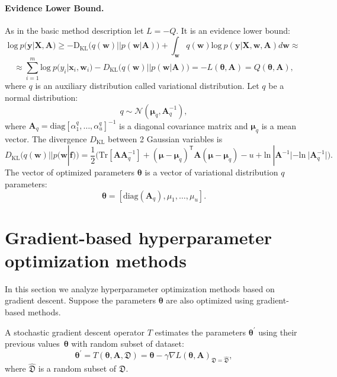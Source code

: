 \documentclass[smallextended]{svjour3}
\begin{document}
\paragraph{Evidence Lower Bound.}
As in the basic method description let $L=-Q$. It is an evidence lower bound:
\begin{equation} 
\label{eq:elbo}
\text{log}~p(\mathbf{y}|\mathbf{X},\mathbf{A})  
\geq 
-\text{D}_\text{KL} \bigl(q(\mathbf{w})||p(\mathbf{w}|\mathbf{A})\bigr) + \int_{\mathbf{w}} q(\mathbf{w})\text{log}~{p(\mathbf{y}|\mathbf{X},\mathbf{w},\mathbf{A})} d \mathbf{w}  \approx
\end{equation}
\[
\approx \sum_{i=1}^m \text{log}~p({y}_i|\mathbf{x}_i, \mathbf{w}_i) - D_\text{KL}\bigl(q (\mathbf{w}) || p (\mathbf{w}|\mathbf{A})\bigr) = -L(\boldsymbol{\theta}, \mathbf{A}) = Q(\boldsymbol{\theta}, \mathbf{A}),
\]
where $q$ is an auxiliary distribution called variational distribution. Let $q$ be a normal distribution:
\begin{equation}
\label{eq:diag}
	q \sim \mathcal{N}(\boldsymbol{\mu}_q, \mathbf{A}^{-1}_q),
\end{equation}
where $\mathbf{A}_q = \text{diag}[\alpha^q_1, \dots, \alpha^q_u]^{-1}$ is  a diagonal covariance matrix and $\boldsymbol{\mu}_q$ is a mean vector.
The divergence $D_\text{KL}$ between 2 Gaussian variables is 
\[
	D_\text{KL}\bigl(q (\mathbf{w}) || p (\mathbf{w}|\mathbf{f})\bigr) = \frac{1}{2} \bigl( \text{Tr} [\mathbf{A}\mathbf{A}^{-1}_q] + (\boldsymbol{\mu} - \boldsymbol{\mu}_q)^\mathsf{T}\mathbf{A}(\boldsymbol{\mu} - \boldsymbol{\mu}_q) - u +\text{ln}~|\mathbf{A}^{-1}| - \text{ln}~|\mathbf{A}_q^{-1}| \bigr).
\]
The vector of optimized parameters $\boldsymbol{\theta}$ is a vector of variational distribution $q$ parameters:
\[
\boldsymbol{\theta} = [\text{diag}(\mathbf{A}_q), {\mu}_1,\dots,{\mu}_u].
\]




\section{Gradient-based hyperparameter optimization methods}
\label{gbhom}
In this section we analyze hyperparameter optimization methods based on gradient descent. Suppose the parameters $\boldsymbol{\theta}$ are also optimized using gradient-based methods. 

\begin{definition}
A stochastic gradient descent operator $T$ estimates the parameters $\boldsymbol{\theta}^\prime$ using their previous values~$\boldsymbol{\theta}$ with random subset of dataset:
\[
	\boldsymbol{\theta}^\prime = T(\boldsymbol{\theta}, \mathbf{A}, \mathfrak{D}) = \boldsymbol{\theta} - \gamma \nabla L(\boldsymbol{\theta}, \mathbf{A})_{\mathfrak{D} = \hat{\mathfrak{D}}},
\]
where $\hat{\mathfrak{D}}$ is a random subset of $\mathfrak{D}$.
\end{definition}
\end{document}
